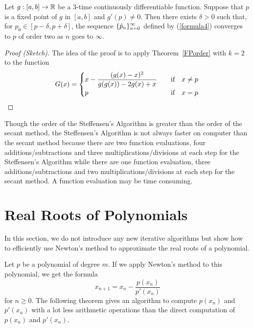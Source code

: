 \begin{theorem}
Let $g:[a,b] \rightarrow \mathbb{R}$ be a $3$-time continuously
differentiable function.  Suppose that $p$ is a fixed point of $g$ in
$[a,b]$ and $g'(p) \not= 0$.  Then there exists $\delta > 0$ such
that, for $p_0 \in [p-\delta, p + \delta]$, the sequence
$\displaystyle \{\hat{p}_n\}_{n=0}^\infty$ defined by (\ref{formula4})
converges to $p$ of order two as $n$ goes to $\infty$.
\end{theorem}

\begin{proof}[Proof (Sketch)]
The idea of the proof is to apply Theorem~\ref{FPorder} with $k=2$ to the
function
\[
G(x) =
\begin{cases}
\displaystyle x - \frac{(g(x)-x)^2}{g(g(x)) -2g(x) + x} & \quad
\text{if} \quad x \neq p \\
p & \quad \text{if} \quad x = p
\end{cases}  \qedhere
\]
\end{proof}

\begin{rmk}
Though the order of the Steffensen's Algorithm is greater than the
order of the secant method, the Steffensen's Algorithm is not always
faster on computer than the secant method because there are two
function evaluations, four additions/subtractions and three
multiplications/divisions at each step for the Steffensen's Algorithm
while there are one function evaluation, three additions/subtractions
and two multiplications/divisions at each step for the secant
method.  A function evaluation may be time consuming.
\end{rmk}

\section{Real Roots of Polynomials}

In this section, we do not introduce any new iterative algorithms but
show how to efficiently use Newton's method to approximate
the real roots of a polynomial.

Let $p$ be a polynomial of degree $m$.  If we apply Newton's method
to this polynomial, we get the formula
\[
x_{n+1} = x_n - \frac{p(x_n)}{p'(x_n)}
\]
for $n \geq 0$.  The following theorem gives an algorithm to compute
$p(x_n)$ and $p'(x_n)$ with a lot less arithmetic operations than the
direct computation of $p(x_n)$ and $p'(x_n)$.

